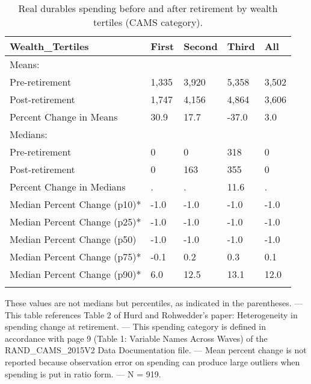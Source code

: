 \begin{table}[tbp] \centering
{}

\caption{Real durables spending before and after retirement by wealth tertiles (CAMS category).}
\begin{tabularx}{\textwidth}{lCCCC}

\toprule
{Wealth\_Tertiles}&{First}&{Second}&{Third}&{All} \tabularnewline
\midrule\addlinespace[1.5ex]
Means:&&&& \tabularnewline
\midrule Pre-retirement&1,335&3,920&5,358&3,502 \tabularnewline
Post-retirement&1,747&4,156&4,864&3,606 \tabularnewline
Percent Change in Means&30.9&17.7&-37.0&3.0 \tabularnewline
\midrule Medians:&&&& \tabularnewline
\midrule Pre-retirement&0&0&318&0 \tabularnewline
Post-retirement&0&163&355&0 \tabularnewline
Percent Change in Medians&.&.&11.6&. \tabularnewline
Median Percent Change (p10)*&-1.0&-1.0&-1.0&-1.0 \tabularnewline
Median Percent Change (p25)*&-1.0&-1.0&-1.0&-1.0 \tabularnewline
Median Percent Change (p50)&-1.0&-1.0&-1.0&-1.0 \tabularnewline
Median Percent Change (p75)*&-0.1&0.2&0.3&0.1 \tabularnewline
Median Percent Change (p90)*&6.0&12.5&13.1&12.0 \tabularnewline
\bottomrule \addlinespace[1.5ex]

\end{tabularx}
\begin{flushleft}
\footnotesize *These values are not medians but percentiles, as indicated in the parentheses. \linebreak --- \linebreak This table references Table 2 of Hurd and Rohwedder's paper: Heterogeneity in spending change at retirement. \linebreak --- \linebreak This spending category is defined in accordance with page 9 (Table 1: Variable Names Across Waves) of the RAND\_CAMS\_2015V2 Data Documentation file. \linebreak --- \linebreak Mean percent change is not reported because observation error on spending can produce large outliers when spending is put in ratio form. \linebreak --- \linebreak N = 919.
\end{flushleft}
\end{table}
